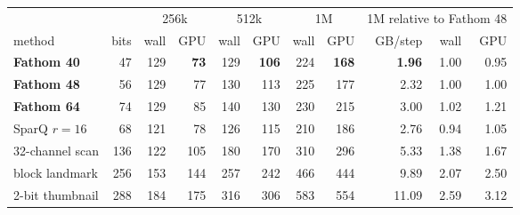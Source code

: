 \begin{tabular}{lrrrrrrrrrr}
\toprule
 & & \multicolumn{2}{c}{256k} & \multicolumn{2}{c}{512k} & \multicolumn{2}{c}{1M} & \multicolumn{3}{c}{1M relative to Fathom 48} \\
method & bits & wall & GPU & wall & GPU & wall & GPU & GB/step & wall & GPU \\
\midrule
\textbf{Fathom 40} & 47 & 129 & \textbf{73} & 129 & \textbf{106} & 224 & \textbf{168} & \textbf{1.96} & 1.00 & 0.95 \\
\textbf{Fathom 48} & 56 & 129 & 77 & 130 & 113 & 225 & 177 & 2.32 & 1.00 & 1.00 \\
\textbf{Fathom 64} & 74 & 129 & 85 & 140 & 130 & 230 & 215 & 3.00 & 1.02 & 1.21 \\
SparQ $r{=}16$ & 68 & 121 & 78 & 126 & 115 & 210 & 186 & 2.76 & 0.94 & 1.05 \\
32-channel scan & 136 & 122 & 105 & 180 & 170 & 310 & 296 & 5.33 & 1.38 & 1.67 \\
block landmark & 256 & 153 & 144 & 257 & 242 & 466 & 444 & 9.89 & 2.07 & 2.50 \\
2-bit thumbnail & 288 & 184 & 175 & 316 & 306 & 583 & 554 & 11.09 & 2.59 & 3.12 \\
\bottomrule
\end{tabular}